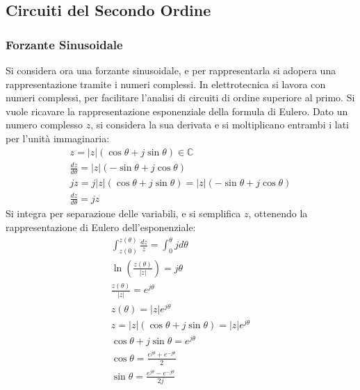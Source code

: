\documentclass{article}
\numberwithin{equation}{subsection}
\begin{document}
\subsection{Circuiti del Secondo Ordine}

\subsubsection{Forzante Sinusoidale}

Si considera ora una forzante sinusoidale, e per rappresentarla si adopera una rappresentazione tramite i numeri complessi. 
In elettrotecnica si lavora con numeri complessi, per facilitare l'analisi di circuiti di ordine superiore al primo. 
Si vuole ricavare la rappresentazione esponenziale della formula di Eulero. 
Dato un numero complesso $z$, si considera la sua derivata e si moltiplicano entrambi i lati per l'unità immaginaria:
\begin{gather*}
    z=|z|(\cos\theta+j\sin\theta)\in\mathbb{C}\\
    \displaystyle\frac{dz}{d\theta}=|z|(-\sin\theta+j\cos\theta)\\
    jz=j|z|(\cos\theta+j\sin\theta)=|z|(-\sin\theta+j\cos\theta)\\
    \displaystyle\frac{dz}{d\theta}=jz
\end{gather*}
Si integra per separazione delle variabili, e si semplifica $z$, ottenendo la rappresentazione di Eulero dell'esponenziale: 
\begin{gather*}
    \displaystyle\int_{z(0)}^{z(\theta)}\frac{dz}{z}=\int_{0}^{\theta}jd\theta\\
    \ln\left(\displaystyle\frac{z(\theta)}{|z|}\right)=j\theta\\
    \displaystyle\frac{z(\theta)}{|z|}=e^{j\theta}\\
    z(\theta)=|z|e^{j\theta}\\
    z=|z|(\cos\theta+j\sin\theta)=|z|e^{j\theta}\\
    \cos\theta+j\sin\theta=e^{j\theta}\\
    \cos\theta=\displaystyle\frac{e^{j\theta}+e^{-j\theta}}{2}\\
    \sin\theta=\displaystyle\frac{e^{j\theta}-e^{-j\theta}}{2j}
\end{gather*}
\end{document}
